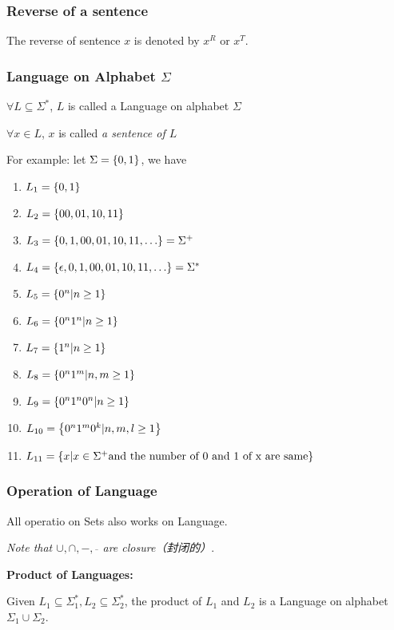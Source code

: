 \documentclass{ctexart}
\DeclarePairedDelimiter{\set}{\{}{\}}
\begin{document}
\subsubsection{Reverse of a sentence}

	The reverse of sentence $x$ is denoted by $x^R$ or $x^T$.

\subsubsection{Language on Alphabet $\Sigma$}

	$\forall L \subseteq \Sigma^*$, $L$ is called {a Language on alphabet $\Sigma$} \par
	$\forall x \in L$, $x$ is called \emph{a sentence of $L$}

	For example: let $\Sigma = \set*{0, 1}$, we have
	\begin{enumerate}
		\item $L_1 = \set*{0, 1}$
		\item $L_2 = \set*{00, 01, 10, 11}$
		\item $L_3 = \set*{0, 1, 00, 01, 10, 11, \dots } = \Sigma^+$
		\item $L_4 = \set*{\epsilon, 0, 1, 00, 01, 10, 11, \dots} = \Sigma^*$
		\item $L_5 = \set*{0^n | n \ge 1}$
		\item $L_6 = \set*{0^n1^n | n \ge 1 }$
		\item $L_7 = \set*{1^n | n \ge 1 }$
		\item $L_8 = \set*{0^n1^m | n, m \ge 1 }$
		\item $L_9 = \set*{0^n1^n0^n | n \ge 1 }$
		\item $L_{10} = \set*{0^n1^m0^k | n,m,l \ge 1}$
		\item $L_{11} = \set*{x | x \in \Sigma^+ \text{and the number of 0 and 1 of x are same}}$
	\end{enumerate}

\subsubsection{Operation of Language}

All operatio on Sets also works on Language.

\emph{Note that $\cup, \cap, -, \overline{\ }$ are closure（封闭的）}.

\textbf{Product of Languages:}

Given $L_1 \subseteq \Sigma_1^*, L_2 \subseteq \Sigma_2^*$, the product of $L_1$ and $L_2$ is a Language on alphabet $\Sigma_1 \cup \Sigma_2$.
\end{document}
